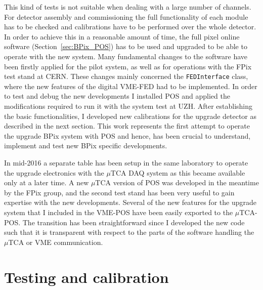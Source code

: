 This kind of tests is not suitable when dealing with a large number of channels. For detector assembly and commissioning the full functionality of each module has to be checked and calibrations have to be performed over the whole detector. In order to achieve this in a reasonable amount of time, the full pixel online software (Section~\ref{sec:BPix_POS}) has to be used and upgraded to be able to operate with the new system.
Many fundamental changes to the software have been firstly applied for the pilot system, as well as for operations with the FPix test stand at CERN.
These changes mainly concerned the \texttt{FEDInterface} class, where the new features of the digital VME-FED had to be implemented.
In order to test and debug the new developments I installed POS and applied the modifications required to run it with the system test at UZH.
After establishing the basic functionalities, I developed new calibrations for the upgrade detector as described in the next section.
This work represents the first attempt to operate the upgrade BPix system with POS and hence, has been crucial to understand, implement and test new BPix specific developments.

In mid-2016 a separate table has been setup in the same laboratory to operate the upgrade electronics with the $\mu$TCA DAQ system as this became available only at a later time.
A new $\mu$TCA version of POS was developed in the meantime by the FPix group, and the second test stand has been very useful to gain expertise with the new developments.
Several of the new features for the upgrade system that I included in the VME-POS have been easily exported to the $\mu$TCA-POS.
The transition has been straightforward since I developed the new code such that it is transparent with respect to the parts of the software handling the $\mu$TCA or VME communication.

\section{Testing and calibration}\label{sec:Phase1Calib}

